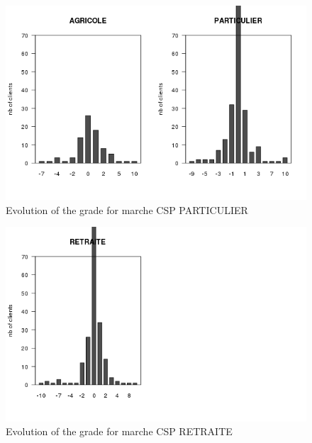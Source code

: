 \documentclass[a4paper, 11pt]{article}
\begin{document}
    \begin{figure}[!ht]
            \centering
            \includegraphics[height = 10 cm]{Remi/Evolution_of_the_grade_for_marche_CSP_PARTICULIER.png}
            \caption{Evolution of the grade for marche CSP PARTICULIER}
            \label{fig:e_CSP_PARTICULIER}
    \end{figure}

    \begin{figure}[!ht]
            \centering
            \includegraphics[height = 10 cm]{Remi/Evolution_of_the_grade_for_marche_CSP_RETRAITE.png}
            \caption{Evolution of the grade for marche CSP RETRAITE}
            \label{fig:e_CSP_RETRAITE}
    \end{figure}
\end{document}
